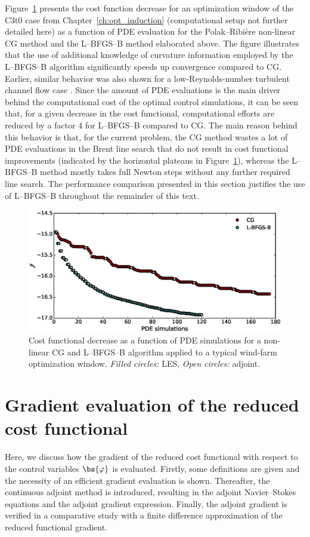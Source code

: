 	Figure~\ref{fig:cg_bfgs} presents the cost function decrease for an optimization window of the C3t0 case from Chapter~\ref{ch:opt_induction} (computational setup not further detailed here) as a function of PDE evaluation for the Polak--Ribi\`ere non-linear CG method and the L--BFGS--B method elaborated above. The figure illustrates that the use of additional knowledge of curvature information employed by the L--BFGS--B algorithm significantly speeds up convergence compared to CG. Earlier, similar behavior was also shown for a low-Reynolds-number turbulent channel flow case \citep{nita2016efficiency}. Since the amount of PDE evaluations is the main driver behind the computational cost of the optimal control simulations, it can be seen that, for a given decrease in the cost functional, computational efforts are reduced by a factor 4 for L--BFGS--B compared to CG. The main reason behind this behavior is that, for the current problem, the CG method wastes a lot of PDE evaluations in the Brent line search that do not result in cost functional improvements (indicated by the horizontal plateaus in Figure~\ref{fig:cg_bfgs}), whereas the L--BFGS--B method mostly takes full Newton steps without any further required line search. The performance comparison presented in this section justifies the use of L--BFGS--B throughout the remainder of this text. 
	
	\begin{figure}
		\centering
		\includegraphics[width=\linewidth]{chapters/optimal_control_problem/figure5.eps}
		\caption{Cost functional decrease as a function of PDE simulations for a non-linear CG and L--BFGS--B algorithm applied to a typical wind-farm optimization window. \emph{Filled circles: } LES, \emph{Open circles: } adjoint. }
		\label{fig:cg_bfgs}
	\end{figure}
	
	
\section{Gradient evaluation of the reduced cost functional}\label{sec:problem_gradient}
	Here, we discuss how the gradient of the reduced cost functional with respect to the control variables $\bs{\varphi}$ is evaluated. Firstly, some definitions are given and the necessity of an efficient gradient evaluation is shown. Thereafter, the continuous adjoint method is introduced, resulting in the adjoint Navier--Stokes equations and the adjoint gradient expression. Finally, the adjoint gradient is verified in a comparative study with a finite difference approximation of the reduced functional gradient. 

